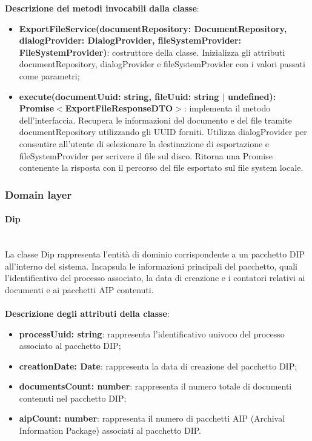 \documentclass[a4paper,12pt]{article}
\begin{document}
{{{              \noindent \textbf{Descrizione dei metodi invocabili dalla classe}:
                \begin{itemize}
                    \item \textbf{ExportFileService(documentRepository: DocumentRepository, dialogProvider: DialogProvider, fileSystemProvider: FileSystemProvider)}: costruttore della classe. Inizializza gli attributi documentRepository, dialogProvider e fileSystemProvider con i valori passati come parametri;
                    \item \textbf{execute(documentUuid: string, fileUuid: string $|$ undefined):\\ Promise$<$ExportFileResponseDTO$>$}: implementa il metodo dell'interfaccia. Recupera le informazioni del documento e del file tramite documentRepository utilizzando gli UUID forniti. Utilizza dialogProvider per consentire all'utente di selezionare la destinazione di esportazione e fileSystemProvider per scrivere il file sul disco. Ritorna una Promise contenente la risposta con il percorso del file esportato sul file system locale.
                \end{itemize}
            }

            \subsubsection{Domain layer} {
                \paragraph{Dip}\label{par:Dip}\mbox{}\\
                La classe Dip rappresenta l'entità di dominio corrispondente a un pacchetto DIP all'interno del sistema. Incapsula le informazioni principali del pacchetto, quali l'identificativo del processo associato, la data di creazione e i contatori relativi ai documenti e ai pacchetti AIP contenuti.\\
                \\
                \textbf{Descrizione degli attributi della classe}:
                \begin{itemize}
                    \item \textbf{processUuid: string}: rappresenta l'identificativo univoco del processo associato al pacchetto DIP;
                    \item \textbf{creationDate: Date}: rappresenta la data di creazione del pacchetto DIP;
                    \item \textbf{documentsCount: number}: rappresenta il numero totale di documenti contenuti nel pacchetto DIP;
                    \item \textbf{aipCount: number}: rappresenta il numero di pacchetti AIP (Archival Information Package) associati al pacchetto DIP.
                \end{itemize}

}}}
\end{document}
